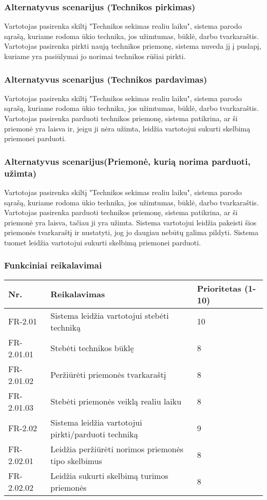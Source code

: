 \documentclass[oneside]{VUMIFPSkursinis}
\begin{document}
\subsubsection{Alternatyvus scenarijus (Technikos pirkimas)}
	Vartotojas pasirenka skiltį "Technikos sekimas realiu laiku", sistema parodo sąrašą, kuriame rodoma ūkio technika, jos užimtumas, būklė, darbo tvarkaraštis. Vartotojas pasirenka pirkti naują technikos priemonę, sistema nuveda jį į puslapį, kuriame yra pasiūlymai jo norimai technikos rūšiai pirkti.
\subsubsection{Alternatyvus scenarijus (Technikos pardavimas)}
	Vartotojas pasirenka skiltį "Technikos sekimas realiu laiku", sistema parodo sąrašą, kuriame rodoma ūkio technika, jos užimtumas, būklė, darbo tvarkaraštis. Vartotojas pasirenka parduoti technikos priemonę, sistema patikrina, ar ši priemonė yra laisva ir, jeigu ji nėra užimta, leidžia vartotojui sukurti skelbimą priemonei parduoti.
\subsubsection{Alternatyvus scenarijus(Priemonė, kurią norima parduoti, užimta)}
	Vartotojas pasirenka skiltį "Technikos sekimas realiu laiku", sistema parodo sąrašą, kuriame rodoma ūkio technika, jos užimtumas, būklė, darbo tvarkaraštis. Vartotojas pasirenka parduoti technikos priemonę, sistema patikrina, ar ši priemonė yra laisva, tačiau ji yra užimta. Sistema vartotojui leidžia pakeisti šios priemonės tvarkaraštį ir nustatyti, jog jo daugiau nebūtų galima pildyti. Sistema tuomet leidžia vartotojui sukurti skelbimą priemonei parduoti.
\subsubsection{Funkciniai reikalavimai}
\begin{table}[htbp]
	\begin{tabularx}{1\textwidth}{ |P{2.5cm}|X|P{3cm }| }  \hline
           	Nr. & Reikalavimas &  Prioritetas (1-10)  \\   \hline 
         		FR-2.01 & Sistema leidžia vartotojui stebėti techniką & 10  \\   \hline
		FR-2.01.01 & Stebėti technikos būklę & 8 \\ \hline
		FR-2.01.02 & Peržiūrėti priemonės tvarkaraštį & 8 \\ \hline
		FR-2.01.03 & Stebėti priemonės veiklą realiu laiku & 8 \\ \hline
        		FR-2.02 & Sistema leidžia vartotojui pirkti/parduoti techniką & 9   \\   \hline
		FR-2.02.01 & Leidžia peržiūrėti norimos priemonės tipo skelbimus & 8 \\ \hline
		FR-2.02.02 & Leidžia sukurti skelbimą turimos priemonės & 8 \\ \hline
	\end{tabularx}
\end{table}
\end{document}
